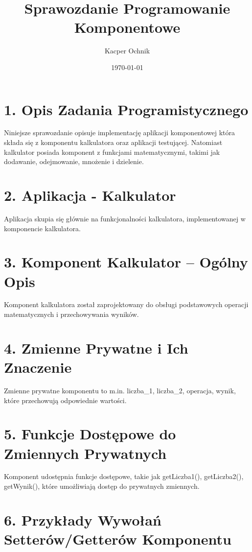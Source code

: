 \documentclass{article}
\title{Sprawozdanie Programowanie Komponentowe}
\author{Kacper Ochnik}
\date{\today}
\begin{document}
\maketitle

\section*{1. Opis Zadania Programistycznego}

Niniejsze sprawozdanie opisuje implementację aplikacji komponentowej która składa się z komponentu kalkulatora oraz aplikacji testującej.
Natomiast kalkulator posiada komponent z funkcjami matematycznymi, takimi jak dodawanie, odejmowanie, mnożenie i dzielenie.

\section*{2. Aplikacja - Kalkulator}

Aplikacja skupia się głównie na funkcjonalności kalkulatora, implementowanej w komponencie kalkulatora.

\section*{3. Komponent Kalkulator – Ogólny Opis}

Komponent kalkulatora został zaprojektowany do obsługi podstawowych operacji matematycznych i przechowywania wyników.

\section*{4. Zmienne Prywatne i Ich Znaczenie}

Zmienne prywatne komponentu to m.in. liczba\_1, liczba\_2, operacja, wynik, które przechowują odpowiednie wartości.

\section*{5. Funkcje Dostępowe do Zmiennych Prywatnych}

Komponent udostępnia funkcje dostępowe, takie jak getLiczba1(), getLiczba2(), getWynik(), które umożliwiają dostęp do prywatnych zmiennych.

\section*{6. Przykłady Wywołań Setterów/Getterów Komponentu}
\end{document}
